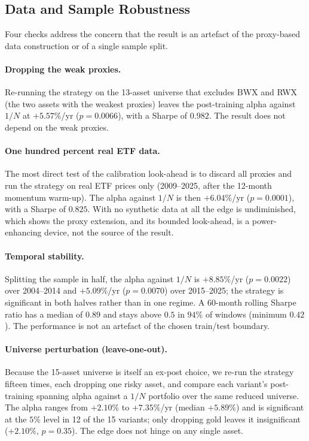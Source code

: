\subsection{Data and Sample Robustness}
\label{sec:res_robustness}

Four checks address the concern that the result is an artefact of the proxy-based
data construction or of a single sample split.

\paragraph{Dropping the weak proxies.}
Re-running the strategy on the 13-asset universe that excludes BWX and RWX (the two
assets with the weakest proxies) leaves the post-training alpha against $1/N$ at
$+5.57\%$/yr ($p = 0.0066$), with a Sharpe of $0.982$. The result does not depend
on the weak proxies.

\paragraph{One hundred percent real ETF data.}
The most direct test of the calibration look-ahead is to discard all proxies
and run the strategy on real ETF prices only (2009--2025, after the 12-month
momentum warm-up). The alpha against $1/N$ is then $+6.04\%$/yr ($p = 0.0001$),
with a Sharpe of $0.825$. With no synthetic data at all the edge is undiminished,
which shows the proxy extension, and its bounded look-ahead, is a power-enhancing
device, not the source of the result.

\paragraph{Temporal stability.}
Splitting the sample in half, the alpha against $1/N$ is $+8.85\%$/yr
($p = 0.0022$) over 2004--2014 and $+5.09\%$/yr ($p = 0.0070$) over 2015--2025; the
strategy is significant in both halves rather than in one regime. A 60-month
rolling Sharpe ratio has a median of $0.89$ and stays above $0.5$ in $94\%$ of
windows (minimum $0.42$). The performance is not an artefact of the chosen
train/test boundary.

\paragraph{Universe perturbation (leave-one-out).}
Because the 15-asset universe is itself an ex-post choice, we re-run the strategy
fifteen times, each dropping one risky asset, and compare each variant's
post-training spanning alpha against a $1/N$ portfolio over the same reduced
universe. The alpha ranges from $+2.10\%$ to $+7.35\%$/yr (median $+5.89\%$) and is
significant at the $5\%$ level in 12 of the 15 variants; only dropping gold leaves
it insignificant ($+2.10\%$, $p = 0.35$). The edge does not hinge on any single
asset.

